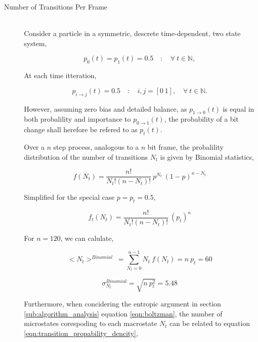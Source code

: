 			\begin{description}
				\item[Number of Transitions Per Frame] \hfill \\
					
					Consider a particle in a symmetric, descrete time-dependent, two state system,

					\begin{equation}
						p_0(t) = p_1(t) = 0.5 \quad : \quad \forall\ t \in \mathbb{N},
					\end{equation}

					At each time itteration,

					\begin{equation}
						p_{i \to j}(t) = 0.5 \quad : \quad i,j = [0\ 1], \quad \forall\ t \in \mathbb{N}.
					\end{equation}

					However, assuming zero bias and detailed balance, as $p_{1 \to 0}(t)$ is equal in both probalility and importance to $p_{0 \to 1}(t)$, the probability of a bit change shall herefore be refered to as $p_{t}(t)$.
					\par
					Over a $n$ step process, analogous to a $n$ bit frame, the probalility distribution of the number of transitions $N_t$ is given by Binomial statistics,

					\begin{equation}
						f(N_{t}) = \frac{n!}{N_{t}!(n-N_{t})!}\ p^{N_{t}}\ (1 - p)^{n-N_{t}}
					\end{equation}

					Simplified for the special case $p = p_{t} = 0.5$,

					\begin{equation}
						f_{t}(N_{t}) = \frac{n!}{N_{t}!(n-N_{t})!}\ (p_{t})^{n}
						\label{eqn:transition_propability_dencity}
					\end{equation}

					For $n = 120$, we can calulate,

					\begin{equation}
						<N_t>^{Binomial} \ = \sum_{N_{t}=0}^{n-1} N_{t}\ f(N_{t}) = n\ p_{t} = 60
						\label{eqn:tansition_expectation}
					\end{equation}

					\begin{equation}
						\sigma_{N_t}^{Binomial} = \sqrt{ n\ p_{t}^2} = 5.48
					\end{equation}

					Furthermore, when concidering the entropic argument in section \ref{sub:algorithm_analysis} equation \ref{eqn:boltzman}, the number of microstates corespoding to each macrostate $N_t$ can be related to equation \ref{eqn:transition_propability_dencity},


\end{description}
